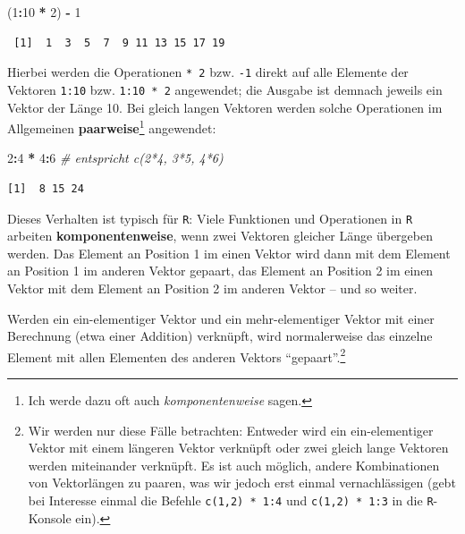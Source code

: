 \documentclass[12pt,]{tufte-book}
\newenvironment{Shaded}{\begin{snugshade}}{\end{snugshade}}
\newcommand{\DecValTok}[1]{\textcolor[rgb]{0.00,0.00,0.81}{#1}}
\newcommand{\StringTok}[1]{\textcolor[rgb]{0.31,0.60,0.02}{#1}}
\newcommand{\CommentTok}[1]{\textcolor[rgb]{0.56,0.35,0.01}{\textit{#1}}}
\newcommand{\OperatorTok}[1]{\textcolor[rgb]{0.81,0.36,0.00}{\textbf{#1}}}
\newcommand{\NormalTok}[1]{#1}
\theoremstyle{definition}
\theoremstyle{definition}
\theoremstyle{definition}
\theoremstyle{remark}
\begin{document}
\begin{Shaded}
\begin{Highlighting}[]
\NormalTok{(}\DecValTok{1}\OperatorTok{:}\DecValTok{10} \OperatorTok{*}\StringTok{ }\DecValTok{2}\NormalTok{) }\OperatorTok{-}\StringTok{ }\DecValTok{1}
\end{Highlighting}
\end{Shaded}

\begin{verbatim}
 [1]  1  3  5  7  9 11 13 15 17 19
\end{verbatim}

Hierbei werden die Operationen \texttt{*\ 2} bzw. \texttt{-1} direkt auf
alle Elemente der Vektoren \texttt{1:10} bzw. \texttt{1:10\ *\ 2}
angewendet; die Ausgabe ist demnach jeweils ein Vektor der Länge 10. Bei
gleich langen Vektoren werden solche Operationen im Allgemeinen
\textbf{paarweise}\footnote{Ich werde dazu oft auch
  \emph{komponentenweise} sagen.} angewendet:

\begin{Shaded}
\begin{Highlighting}[]
\DecValTok{2}\OperatorTok{:}\DecValTok{4} \OperatorTok{*}\StringTok{ }\DecValTok{4}\OperatorTok{:}\DecValTok{6}  \CommentTok{# entspricht c(2*4, 3*5, 4*6)}
\end{Highlighting}
\end{Shaded}

\begin{verbatim}
[1]  8 15 24
\end{verbatim}

Dieses Verhalten ist typisch für \texttt{R}: Viele Funktionen und
Operationen in \texttt{R} arbeiten \textbf{komponentenweise}, wenn zwei
Vektoren gleicher Länge übergeben werden. Das Element an Position 1 im
einen Vektor wird dann mit dem Element an Position 1 im anderen Vektor
gepaart, das Element an Position 2 im einen Vektor mit dem Element an
Position 2 im anderen Vektor -- und so weiter.

Werden ein ein-elementiger Vektor und ein mehr-elementiger Vektor mit
einer Berechnung (etwa einer Addition) verknüpft, wird normalerweise das
einzelne Element mit allen Elementen des anderen Vektors
``gepaart''.\footnote{Wir werden nur diese Fälle betrachten: Entweder
  wird ein ein-elementiger Vektor mit einem längeren Vektor verknüpft
  oder zwei gleich lange Vektoren werden miteinander verknüpft. Es ist
  auch möglich, andere Kombinationen von Vektorlängen zu paaren, was wir
  jedoch erst einmal vernachlässigen (gebt bei Interesse einmal die
  Befehle \texttt{c(1,2)\ *\ 1:4} und \texttt{c(1,2)\ *\ 1:3} in die
  \texttt{R}-Konsole ein).}
\end{document}

